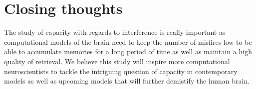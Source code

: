 \section{Closing thoughts}

The study of capacity with regards to interference is really important as computational models of the brain need to keep the number of misfires low to be able to accumulate memories for a long period of time as well as maintain a high quality of retrieval.  We believe this study will inspire more computational neuroscientists to tackle the intriguing question of capacity in contemporary models as well as upcoming models that will further demistify the human brain. 
